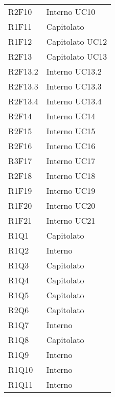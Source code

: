 \begin{longtable} {
			>{\centering}p{28mm}  
			>{}p{20mm}
		}
		R2F10 & Interno UC10 \TBstrut \\ [2mm]
		R1F11 & Capitolato \TBstrut \\ [2mm]		
		R1F12 & Capitolato UC12 \TBstrut \\ [2mm]	
		R2F13 & Capitolato UC13 \TBstrut \\ [2mm]		
		R2F13.2 & Interno UC13.2 \TBstrut \\ [2mm]		
		R2F13.3 & Interno UC13.3 \TBstrut \\ [2mm]	
		R2F13.4 & Interno UC13.4 \TBstrut \\ [2mm]	
		R2F14 & Interno UC14 \TBstrut \\ [2mm]		
		R2F15 & Interno UC15 \TBstrut \\ [2mm]		
		R2F16 & Interno UC16 \TBstrut \\ [2mm]
		R3F17 & Interno UC17 \TBstrut \\ [2mm]
		R2F18 & Interno UC18 \TBstrut \\ [2mm]
		R1F19 & Interno UC19 \TBstrut \\ [2mm]
		R1F20 & Interno UC20 \TBstrut \\ [2mm]
		R1F21 & Interno UC21 \TBstrut \\ [2mm]
		
		R1Q1 & Capitolato \TBstrut \\ [2mm]
		R1Q2 & Interno \TBstrut \\ [2mm]
		R1Q3 & Capitolato \TBstrut \\ [2mm]
		R1Q4 & Capitolato \TBstrut \\ [2mm]
		R1Q5 & Capitolato \TBstrut \\ [2mm]
		R2Q6 & Capitolato \TBstrut \\ [2mm]
		R1Q7 & Interno \TBstrut \\ [2mm]
		R1Q8 & Capitolato \TBstrut \\ [2mm]
		R1Q9 & Interno \TBstrut \\ [2mm]
		R1Q10 & Interno \TBstrut \\ [2mm]
		R1Q11 & Interno \TBstrut \\ [2mm]
		

\end{longtable}
